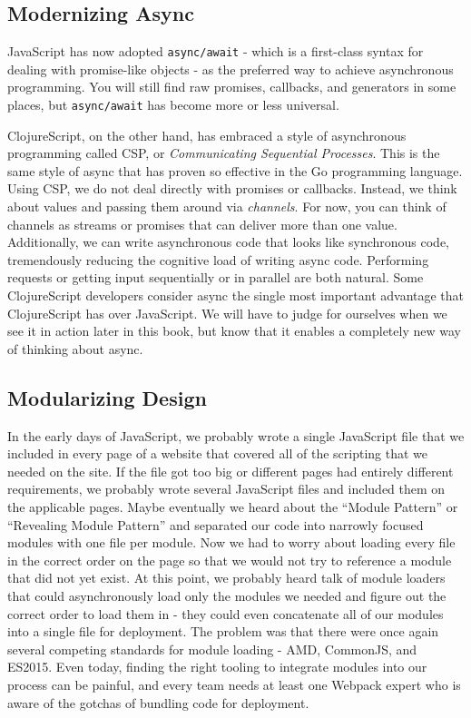 \documentclass[10pt,twoside,openright]{memoir}
\begin{document}
\subsection{Modernizing Async}

JavaScript has now adopted \texttt{async/await} - which is a first-class
syntax for dealing with promise-like objects - as the preferred way to
achieve asynchronous programming. You will still find raw promises,
callbacks, and generators in some places, but \texttt{async/await} has
become more or less universal.

ClojureScript, on the other hand, has embraced a style of asynchronous
programming called CSP, or \emph{Communicating Sequential Processes}.
This is the same style of async that has proven so effective in the Go
programming language. Using CSP, we do not deal directly with promises
or callbacks. Instead, we think about values and passing them around via
\emph{channels}. For now, you can think of channels as streams or
promises that can deliver more than one value. Additionally, we can
write asynchronous code that looks like synchronous code, tremendously
reducing the cognitive load of writing async code. Performing requests
or getting input sequentially or in parallel are both natural. Some
ClojureScript developers consider async the single most important
advantage that ClojureScript has over JavaScript. We will have to judge
for ourselves when we see it in action later in this book, but know that
it enables a completely new way of thinking about async.

\subsection{Modularizing Design}

In the early days of JavaScript, we probably wrote a single JavaScript
file that we included in every page of a website that covered all of the
scripting that we needed on the site. If the file got too big or
different pages had entirely different requirements, we probably wrote
several JavaScript files and included them on the applicable pages.
Maybe eventually we heard about the ``Module Pattern'' or ``Revealing
Module Pattern'' and separated our code into narrowly focused modules
with one file per module. Now we had to worry about loading every file
in the correct order on the page so that we would not try to reference a
module that did not yet exist. At this point, we probably heard talk of
module loaders that could asynchronously load only the modules we needed
and figure out the correct order to load them in - they could even
concatenate all of our modules into a single file for deployment. The
problem was that there were once again several competing standards for
module loading - AMD, CommonJS, and ES2015. Even today, finding the
right tooling to integrate modules into our process can be painful, and
every team needs at least one Webpack expert who is aware of the gotchas
of bundling code for deployment.
\end{document}
